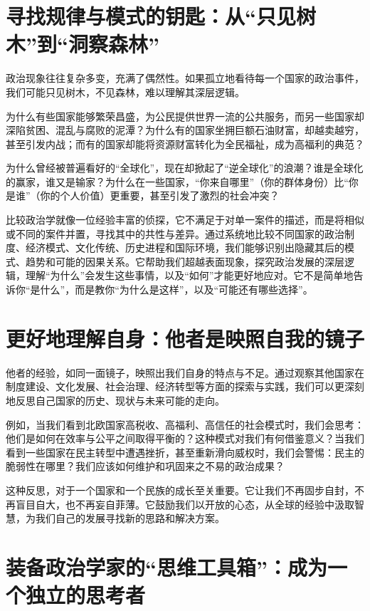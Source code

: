 \section{寻找规律与模式的钥匙：从“只见树木”到“洞察森林”}

政治现象往往复杂多变，充满了偶然性。如果孤立地看待每一个国家的政治事件，我们可能只见树木，不见森林，难以理解其深层逻辑。

为什么有些国家能够繁荣昌盛，为公民提供世界一流的公共服务，而另一些国家却深陷贫困、混乱与腐败的泥潭？为什么有的国家坐拥巨额石油财富，却越卖越穷，甚至引发内战；而有的国家却能将资源财富转化为全民福祉，成为高福利的典范？

为什么曾经被普遍看好的“全球化”，现在却掀起了“逆全球化”的浪潮？谁是全球化的赢家，谁又是输家？为什么在一些国家，“你来自哪里”（你的群体身份）比“你是谁”（你的个人价值）更重要，甚至引发了激烈的社会冲突？

比较政治学就像一位经验丰富的侦探，它不满足于对单一案件的描述，而是将相似或不同的案件并置，寻找其中的共性与差异。通过系统地比较不同国家的政治制度、经济模式、文化传统、历史进程和国际环境，我们能够识别出隐藏其后的模式、趋势和可能的因果关系。它帮助我们超越表面现象，探究政治发展的深层逻辑，理解“为什么”会发生这些事情，以及“如何”才能更好地应对。它不是简单地告诉你“是什么”，而是教你“为什么是这样”，以及“可能还有哪些选择”。

\section{更好地理解自身：他者是映照自我的镜子}

他者的经验，如同一面镜子，映照出我们自身的特点与不足。通过观察其他国家在制度建设、文化发展、社会治理、经济转型等方面的探索与实践，我们可以更深刻地反思自己国家的历史、现状与未来可能的走向。

例如，当我们看到北欧国家高税收、高福利、高信任的社会模式时，我们会思考：他们是如何在效率与公平之间取得平衡的？这种模式对我们有何借鉴意义？当我们看到一些国家在民主转型中遭遇挫折，甚至重新滑向威权时，我们会警惕：民主的脆弱性在哪里？我们应该如何维护和巩固来之不易的政治成果？

这种反思，对于一个国家和一个民族的成长至关重要。它让我们不再固步自封，不再盲目自大，也不再妄自菲薄。它鼓励我们以开放的心态，从全球的经验中汲取智慧，为我们自己的发展寻找新的思路和解决方案。

\section{装备政治学家的“思维工具箱”：成为一个独立的思考者}

